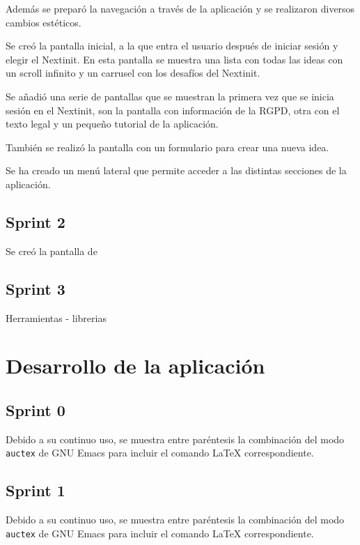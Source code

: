 Además se preparó la navegación a través de la aplicación y se realizaron diversos 
cambios estéticos.

Se creó la pantalla inicial, a la que entra el usuario después de iniciar sesión y elegir el 
Nextinit. En esta pantalla se muestra una lista con todas las ideas con un scroll infinito
y un carrusel con los desafíos del Nextinit.

Se añadió una serie de pantallas que se muestran la primera vez que se inicia sesión 
en el Nextinit, son la pantalla con información de la RGPD, otra con el texto legal y 
un pequeño tutorial de la aplicación.

También se realizó la pantalla con un formulario para crear una nueva idea.

Se ha creado un menú lateral que permite acceder a las distintas secciones de la 
aplicación.

\subsection{Sprint 2}

Se creó la pantalla de

\subsection{Sprint 3}



Herramientas
- librerias

\section{Desarrollo de la aplicación}

\subsection{Sprint 0}

Debido a su continuo uso, se muestra entre paréntesis la combinación del modo
\texttt{auctex} de GNU Emacs para incluir el comando \LaTeX{} correspondiente.

\subsection{Sprint 1}

Debido a su continuo uso, se muestra entre paréntesis la combinación del modo
\texttt{auctex} de GNU Emacs para incluir el comando \LaTeX{} correspondiente.

